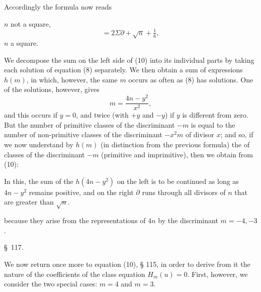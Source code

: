 Accordingly the formula now reads


$n$ not a square,
\[
= 2\Sigma\partial + \sqrt{n} + \tfrac{1}{6},
\]
$n$ a square.

We decompose the sum on the left side of (10) into its individual parts by taking each solution of equation (8) separately. We then obtain a sum of expressions $h(m)$, in which, however, the same $m$ occurs as often as (8) has solutions. One of the solutions, however, gives
\[
m = \frac{4n-y^2}{x^2},
\]
and this occurs  if $y=0$, and twice (with $+y$ and $-y$) if $y$ is different from zero. But the number of primitive classes of the discriminant $-m$ is equal to the number of non-primitive classes of the discriminant $-x^2m$ of divisor $x$; and so, if we now understand by $h(m)$ (in distinction from the previous formula) the  of classes of the discriminant $-m$ (primitive and imprimitive), then we obtain from (10):

In this, the sum of the $h(4n-y^2)$ on the left is to be continued as long as $4n-y^2$ remains positive, and on the right $\partial$ runs through all divisors of $n$ that are greater than $\sqrt{n}$.

 because they arise from the representations of $4n$ by the discriminant $m=-4,-3$.

\begin{center}
\S\ 117. \textbf{}
\end{center}

We now return once more to equation (10), § 115, in order to derive from it the nature of the coefficients of the class equation $H_m(u)=0$. First, however, we consider the two special cases: $m=4$ and $m=3$.

